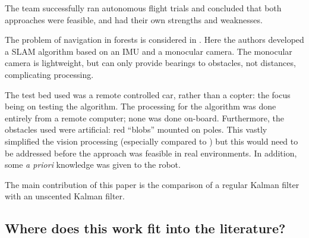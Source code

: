 \documentclass[12pt,oneside,a4paper]{book}
\begin{document}

The team successfully ran autonomous flight trials and concluded that
both approaches were feasible, and had their own strengths and
weaknesses.




The problem of navigation in forests is considered in
\cite{langelaan2005towards}. Here the authors developed a SLAM
algorithm based on an IMU and a monocular camera. The monocular camera
is lightweight, but can only provide bearings to obstacles, not
distances, complicating processing.

The test bed used was a remote controlled car, rather than a copter:
the focus being on testing the algorithm. The processing for the
algorithm was done entirely from a remote computer; none was done
on-board. Furthermore, the obstacles used were artificial: red
``blobs'' mounted on poles. This vastly simplified the vision
processing (especially compared to \cite{5152680}) but this would need
to be addressed before the approach was feasible in real
environments. In addition, some \emph{a priori}
knowledge was given to the robot.

The main contribution of this paper is the comparison of a regular
Kalman filter with an unscented Kalman filter. 
 
\subsection{Where does this work fit into the literature?}
\label{sec:where-does-this}
\end{document}
